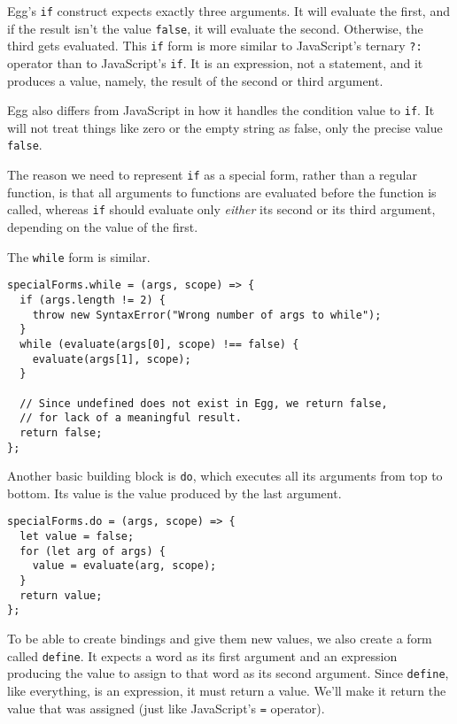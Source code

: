Egg's \lstinline`if` construct expects exactly three arguments. It will evaluate the first, and if the result isn't the value \lstinline`false`, it will evaluate the second. Otherwise, the third gets evaluated. This \lstinline`if` form is more similar to JavaScript's ternary \lstinline`?:` operator than to JavaScript's \lstinline`if`. It is an expression, not a statement, and it produces a value, namely, the result of the second or third argument.

Egg also differs from JavaScript in how it handles the condition value to \lstinline`if`. It will not treat things like zero or the empty string as false, only the precise value \lstinline`false`.

The reason we need to represent \lstinline`if` as a special form, rather than a regular function, is that all arguments to functions are evaluated before the function is called, whereas \lstinline`if` should evaluate only \emph{either} its second or its third argument, depending on the value of the first.

The \lstinline`while` form is similar.

\begin{lstlisting}
specialForms.while = (args, scope) => {
  if (args.length != 2) {
    throw new SyntaxError("Wrong number of args to while");
  }
  while (evaluate(args[0], scope) !== false) {
    evaluate(args[1], scope);
  }

  // Since undefined does not exist in Egg, we return false,
  // for lack of a meaningful result.
  return false;
};
\end{lstlisting}
\noindent

Another basic building block is \lstinline`do`, which executes all its arguments from top to bottom. Its value is the value produced by the last argument.

\begin{lstlisting}
specialForms.do = (args, scope) => {
  let value = false;
  for (let arg of args) {
    value = evaluate(arg, scope);
  }
  return value;
};
\end{lstlisting}
\noindent{}

To be able to create bindings and give them new values, we also create a form called \lstinline`define`. It expects a word as its first argument and an expression producing the value to assign to that word as its second argument. Since \lstinline`define`, like everything, is an expression, it must return a value. We'll make it return the value that was assigned (just like JavaScript's \lstinline`=` operator).

